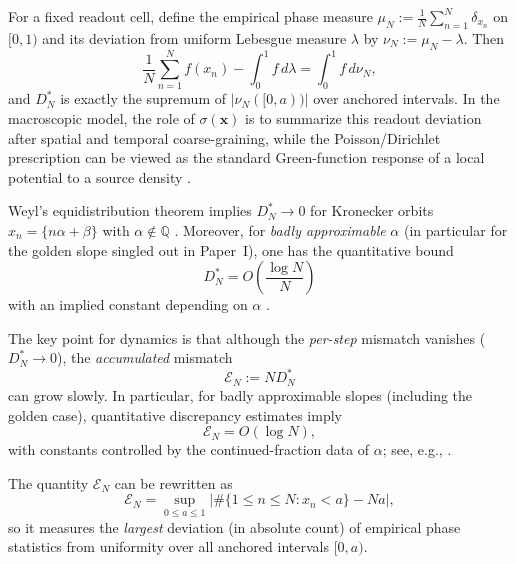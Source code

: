 \begin{remark}
For a fixed readout cell, define the empirical phase measure $\mu_N:=\frac{1}{N}\sum_{n=1}^N \delta_{x_n}$ on $[0,1)$ and its deviation from uniform Lebesgue measure $\lambda$ by $\nu_N:=\mu_N-\lambda$. Then
\begin{equation}
  \frac{1}{N}\sum_{n=1}^N f(x_n)-\int_0^1 f\,d\lambda=\int_0^1 f\,d\nu_N,
\end{equation}
and $D_N^*$ is exactly the supremum of $|\nu_N([0,a))|$ over anchored intervals. In the macroscopic model, the role of $\sigma(\mathbf{x})$ is to summarize this readout deviation after spatial and temporal coarse-graining, while the Poisson/Dirichlet prescription can be viewed as the standard Green-function response of a local potential to a source density \cite{Jackson1998}.
\end{remark}

Weyl's equidistribution theorem implies $D_N^*\to 0$ for Kronecker orbits $x_n=\{n\alpha+\beta\}$ with $\alpha\notin\mathbb{Q}$ \cite{Weyl1916, KuipersNiederreiter1974}. Moreover, for \emph{badly approximable} $\alpha$ (in particular for the golden slope singled out in Paper~I), one has the quantitative bound
\begin{equation}
  D_N^* = O\!\left(\frac{\log N}{N}\right)
\end{equation}
with an implied constant depending on $\alpha$ \cite{KuipersNiederreiter1974}.

The key point for dynamics is that although the \emph{per-step} mismatch vanishes ($D_N^*\to 0$), the \emph{accumulated} mismatch
\begin{equation}
  \mathcal{E}_N := N D_N^*
\end{equation}
can grow slowly. In particular, for badly approximable slopes (including the golden case), quantitative discrepancy estimates imply
\begin{equation}
  \mathcal{E}_N=O(\log N),
\end{equation}
with constants controlled by the continued-fraction data of $\alpha$; see, e.g., \cite{Denjoy1932, Koksma1935, KuipersNiederreiter1974}.

\begin{remark}
The quantity $\mathcal{E}_N$ can be rewritten as
\begin{equation}
  \mathcal{E}_N
  =\sup_{0\le a\le 1}\left|\#\{1\le n\le N:x_n<a\}-Na\right|,
\end{equation}
so it measures the \emph{largest} deviation (in absolute count) of empirical phase statistics from uniformity over all anchored intervals $[0,a)$.
\end{remark}


